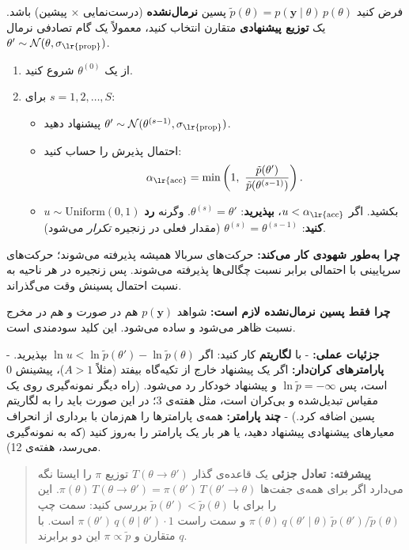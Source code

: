 فرض کنید \(\tilde p(\theta) = p(\mathbf{y}\mid\theta)\,p(\theta)\) پسین
\textbf{نرمال‌نشده} (درست‌نمایی × پیشین) باشد. یک \textbf{توزیع پیشنهادی}
متقارن انتخاب کنید، معمولاً یک گام تصادفی نرمال
\(\theta' \sim \mathcal{N}(\theta, \sigma_{\text{\lr{prop}}})\).

\begin{enumerate}
\def\labelenumi{\arabic{enumi}.}
\tightlist
\item
  از یک \(\theta^{(0)}\) شروع کنید.
\item
  برای \(s = 1, 2, \dots, S\):

  \begin{itemize}
  \tightlist
  \item
    پیشنهاد دهید
    \(\theta' \sim \mathcal{N}(\theta^{(s-1)}, \sigma_{\text{\lr{prop}}})\).
  \item
    احتمال پذیرش را حساب کنید: \[
    \alpha_{\text{\lr{acc}}} = \min\left(1,\ \frac{\tilde p(\theta')}{\tilde p(\theta^{(s-1)})}\right).
    \]
  \item
    \(u \sim \mathrm{Uniform}(0, 1)\) بکشید. اگر
    \(u < \alpha_{\text{\lr{acc}}}\)، \textbf{بپذیرید}:
    \(\theta^{(s)} = \theta'\). وگرنه \textbf{رد کنید}:
    \(\theta^{(s)} = \theta^{(s-1)}\) (مقدار فعلی در زنجیره \emph{تکرار}
    می‌شود).
  \end{itemize}
\end{enumerate}

\textbf{چرا به‌طور شهودی کار می‌کند:} حرکت‌های سربالا همیشه پذیرفته می‌شوند؛
حرکت‌های سرپایینی با احتمالی برابر نسبت چگالی‌ها پذیرفته می‌شوند. پس زنجیره
در هر ناحیه به نسبت احتمال پسینش وقت می‌گذراند.

\textbf{چرا فقط پسین نرمال‌نشده لازم است:} شواهد \(p(\mathbf{y})\) هم در
صورت و هم در مخرج نسبت ظاهر می‌شود و ساده می‌شود. این کلید سودمندی
 است.

\textbf{جزئیات عملی:} - با \textbf{لگاریتم} کار کنید: اگر
\(\ln u < \ln\tilde p(\theta') - \ln\tilde p(\theta)\) بپذیرید. -
\textbf{پارامترهای کران‌دار:} اگر یک پیشنهاد خارج از تکیه‌گاه بیفتد (مثلاً
\(A > 1\))، پیشینش 0 است، پس \(\ln\tilde p = -\infty\) و پیشنهاد خودکار
رد می‌شود. (راه دیگر نمونه‌گیری روی یک مقیاس تبدیل‌شده و بی‌کران است، مثل
هفته‌ی 3؛ در این صورت باید  را به لگاریتم پسین اضافه کرد.) -
\textbf{چند پارامتر:} همه‌ی پارامترها را هم‌زمان با برداری از انحراف
معیارهای پیشنهادی پیشنهاد دهید، یا هر بار یک پارامتر را به‌روز کنید (که
به نمونه‌گیری  می‌رسد، هفته‌ی 12).

\begin{quote}
\textbf{پیشرفته: تعادل جزئی } یک قاعده‌ی گذار
\(T(\theta \to \theta')\) توزیع \(\pi\) را ایستا نگه می‌دارد اگر برای
همه‌ی جفت‌ها
\(\pi(\theta)\,T(\theta \to \theta') = \pi(\theta')\,T(\theta' \to \theta)\).
این را برای  با \(\tilde p(\theta') < \tilde p(\theta)\)
بررسی کنید: سمت چپ
\(\pi(\theta)\, q(\theta'\mid\theta)\, \tilde p(\theta')/\tilde p(\theta)\)
و سمت راست \(\pi(\theta')\, q(\theta\mid\theta') \cdot 1\) است. با \(q\)
متقارن و \(\pi \propto \tilde p\) این دو برابرند.
\end{quote}

